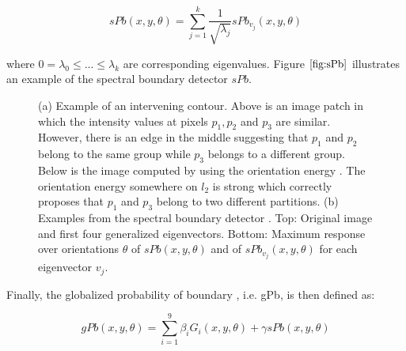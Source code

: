 \documentclass{SMBV12}
\begin{document}
\begin{equation}
sPb(x, y, \theta) = \sum\limits_{j=1}^{k}\dfrac{1}{\sqrt{\lambda_j}}sPb_{v_j}(x, y, \theta)
\end{equation}

where $0 = \lambda_0 \leq ... \leq \lambda_k$ are corresponding eigenvalues. Figure $\ref{fig:sPb}$ illustrates an example of the spectral boundary detector $sPb$.

\begin{figure}[htbp]
    \centering
    \caption{(a) Example of an intervening contour. Above is an image patch in which the intensity values at pixels $p_1, p_2$ and $p_3$ are similar. However, there is an edge in the middle suggesting that $p_1$ and $p_2$ belong to the same group while $p_3$ belongs to a different group. Below is the image computed by using the orientation energy \cite{leung1998contour}. The orientation energy somewhere on $l_2$ is strong which correctly proposes that $p_1$ and $p_3$ belong to two different partitions. (b) Examples from the spectral boundary detector \cite{maire2008using}. Top: Original image and first four generalized eigenvectors. Bottom: Maximum response over orientations $\theta$ of $sPb(x, y, \theta)$ and of $sPb_{v_j}(x, y, \theta)$ for each eigenvector $v_j$.}
\end{figure}

Finally, the globalized probability of boundary , i.e. gPb, is then defined as:

\begin{equation}
gPb(x, y, \theta) = \sum\limits_{i = 1}^{9}\beta_i G_i(x, y, \theta) + \gamma sPb(x, y, \theta)
\end{equation}
\end{document}
